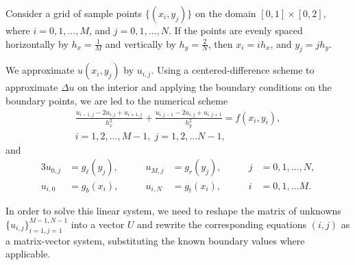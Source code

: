 \documentclass{homework}
\begin{document}
	\begin{alphaparts}
		\questionpart Consider a grid of sample points $\{(x_i, y_j)\}$ on the domain $[0,1]\times[0,2]$, where $i = 0,1,\dots, M$, and $j = 0,1,\dots, N$. If the points are evenly spaced horizontally by $h_x = \frac{1}{M}$ and vertically by $h_y = \frac{2}{N}$, then $x_i = ih_x$, and $y_j = jh_y$.
		
		We approximate $u(x_i,y_j)$ by $u_{i,j}$. Using a centered-difference scheme to approximate $\Delta u$ on the interior and applying the boundary conditions on the boundary points, we are led to the numerical scheme
		\begin{equation*}
			\tag{$i,j$}
			\begin{split}
				\frac{u_{i-1,j} - 2u_{i,j} + u_{i+1,j}}{h_x^2} + \frac{u_{i,j-1} -2 u_{i,j} + u_{i,j+1}}{h_y^2} = f(x_i, y_i),\\  i=1,2,\dots, M-1,\; j=1,2,\dots N-1,
			\end{split}
		\end{equation*}
		and
		\begin{alignat*}{3}
			u_{0,j} &= g_\ell(y_j),& \qquad u_{M,j} &= g_r(y_j),& \qquad j&=0,1,\dots,N,\\
			u_{i,0} &= g_b(x_i), & \qquad u_{i,N} &= g_t(x_i),& \qquad i&=0,1,\dots M.
		\end{alignat*}
		
		In order to solve this linear system, we need to reshape the matrix of unknowns $\{u_{i,j}\}_{i=1,j=1}^{M-1,N-1}$ into a vector $U$ and rewrite the corresponding equations $(i,j)$ as a matrix-vector system, substituting the known boundary values where applicable.
		

\end{alphaparts}
\end{document}
